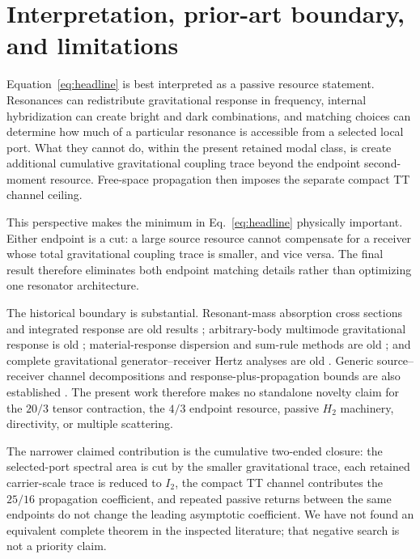 \section{Interpretation, prior-art boundary, and limitations}
\label{sec:interpretation}

Equation~\eqref{eq:headline} is best interpreted as a passive resource statement. Resonances can redistribute gravitational response in frequency, internal hybridization can create bright and dark combinations, and matching choices can determine how much of a particular resonance is accessible from a selected local port. What they cannot do, within the present retained modal class, is create additional cumulative gravitational coupling trace beyond the endpoint second-moment resource. Free-space propagation then imposes the separate compact TT channel ceiling.

This perspective makes the minimum in Eq.~\eqref{eq:headline} physically important. Either endpoint is a cut: a large source resource cannot compensate for a receiver whose total gravitational coupling trace is smaller, and vice versa. The final result therefore eliminates both endpoint matching details rather than optimizing one resonator architecture.

The historical boundary is substantial. Resonant-mass absorption cross sections and integrated response are old results \cite{PaikWagoner1976,Aguiar2011}; arbitrary-body multimode gravitational response is old \cite{Lobo1995}; material-response dispersion and sum-rule methods are old \cite{Srivastava2003}; and complete gravitational generator--receiver Hertz analyses are old \cite{Rudenko2003}. Generic source--receiver channel decompositions and response-plus-propagation bounds are also established \cite{Miller2000,Molesky2020}. The present work therefore makes no standalone novelty claim for the $20/3$ tensor contraction, the $4/3$ endpoint resource, passive $H_2$ machinery, directivity, or multiple scattering.

The narrower claimed contribution is the cumulative two-ended closure: the selected-port spectral area is cut by the smaller gravitational trace, each retained carrier-scale trace is reduced to $I_2$, the compact TT channel contributes the $25/16$ propagation coefficient, and repeated passive returns between the same endpoints do not change the leading asymptotic coefficient. We have not found an equivalent complete theorem in the inspected literature; that negative search is not a priority claim.

